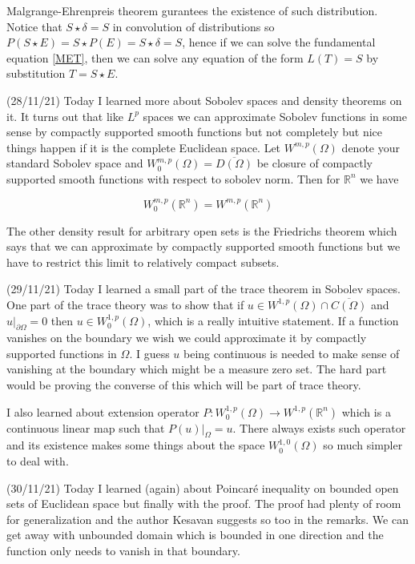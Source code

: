 \documentclass[12pt,a4paper]{article}
\newcommand{\R}{\mathbb{R}}
\begin{document}
   Malgrange-Ehrenpreis theorem gurantees the existence of such distribution. Notice that $S \star \delta = S$ in convolution of distributions so $P(S \star E ) = S \star P(E) = S \star \delta = S$, hence if we can solve the fundamental equation \eqref{MET}, then we can solve any equation of the form $L(T) = S$ by substitution $T = S \star E$.
   
   (28/11/21) Today I learned more about Sobolev spaces and density theorems on it. It turns out that like $L^p$ spaces we can approximate Sobolev functions in some sense by compactly supported smooth functions but not completely but nice things happen if it is the complete Euclidean space. Let $W^{m,p}(\Omega)$ denote your standard Sobolev space and $W^{m,p}_0(\Omega) = \overline{D(\Omega)}$ be closure of compactly supported smooth functions with respect to sobolev norm. Then for $\R^n$ we have 
   
   \[  W^{m,p}_0(\R^n) = W^{m,p}(\R^n)\]
   
   The other density result for arbitrary open sets is the Friedrichs theorem which says that we can approximate by compactly supported smooth functions but we have to restrict this limit to relatively compact subsets.
   
   (29/11/21) Today I learned a small part of the trace theorem in Sobolev spaces. One part of the trace theory was to show that if $u \in W^{1,p}(\Omega) \cap \overline{C(\Omega)}$ and $u|_{\partial \Omega} = 0$ then $u \in W^{1,p}_0(\Omega)$, which is a really intuitive statement. If a function vanishes on the boundary we wish we could approximate it by compactly supported functions in $\Omega$. I guess $u$ being continuous is needed to make sense of vanishing at the boundary which might be a measure zero set. The hard part would be proving the converse of this which will be part of trace theory.
   
   I also learned about extension operator $P : W^{1,p}_0(\Omega) \to W^{1,p}(\R^n)$ which is a continuous linear map such that $P(u)|_{\Omega} = u$. There always exists such operator and its existence makes some things about the space $W^{1,0}_0(\Omega)$ so much simpler to deal with.
   
   (30/11/21) Today I learned (again) about Poincar\'{e} inequality on bounded open sets of Euclidean space but finally with the proof. The proof had plenty of room for generalization and the author Kesavan suggests so too in the remarks. We can get away with unbounded domain which is bounded in one direction and the function only needs to vanish in that boundary.\\
   
\end{document}
